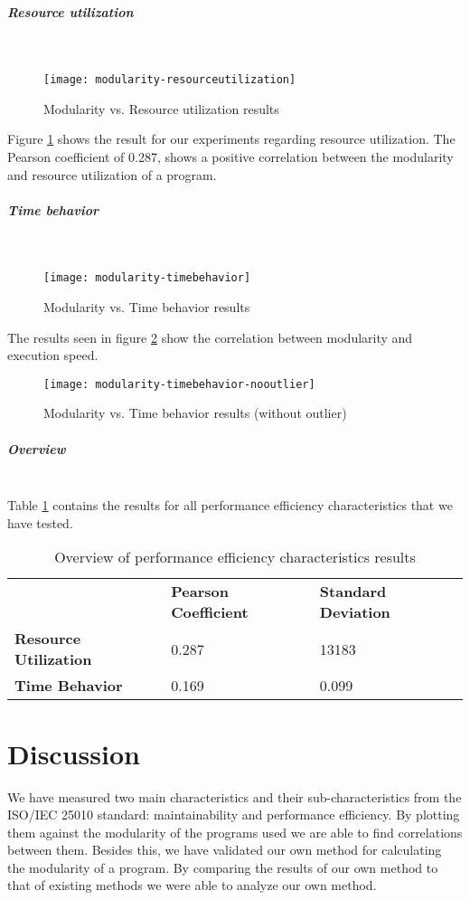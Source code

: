 \documentclass[twoside]{uva-inf-bachelor-thesis}
\newcommand{\myparagraph}[1]{\paragraph{#1}\mbox{}\\}
\begin{document}
\myparagraph{Resource utilization}
\begin{figure}[H]
    \label{figure:perf-res}
    \caption{Modularity vs. Resource utilization results}
    \centering
        \texttt{[image: modularity-resourceutilization]}
\end{figure}

Figure \ref{figure:perf-res} shows the result for our experiments regarding resource utilization. The Pearson coefficient of 0.287, shows a positive correlation between the modularity and resource utilization of a program.

\myparagraph{Time behavior}
\begin{figure}[H]
    \label{figure:perf-time}
    \caption{Modularity vs. Time behavior results}
    \centering
        \texttt{[image: modularity-timebehavior]}
\end{figure}

The results seen in figure \ref{figure:perf-time} show the correlation between modularity and execution speed. 

\begin{figure}[H]
    \label{figure:perf-time-no}
    \caption{Modularity vs. Time behavior results (without outlier)}
    \centering
        \texttt{[image: modularity-timebehavior-nooutlier]}
\end{figure}

\myparagraph{Overview}
Table \ref{table:perf-overview} contains the results for all performance efficiency characteristics that we have tested. 

\begin{table}[H]
\centering
\caption{Overview of performance efficiency characteristics results}
\label{table:perf-overview}
\begin{tabular}{lll}
                              & \textbf{Pearson Coefficient} & \textbf{Standard Deviation} \\
\textbf{Resource Utilization} & 0.287                        & 13183                       \\
\textbf{Time Behavior}        & 0.169                        & 0.099                      
\end{tabular}
\end{table}

\chapter{Discussion}
We have measured two main characteristics and their sub-characteristics from the ISO/IEC 25010 standard: maintainability and performance efficiency. By plotting them against the modularity of the programs used we are able to find correlations between them. Besides this, we have validated our own method for calculating the modularity of a program. By comparing the results of our own method to that of existing methods we were able to analyze our own method.
\end{document}
